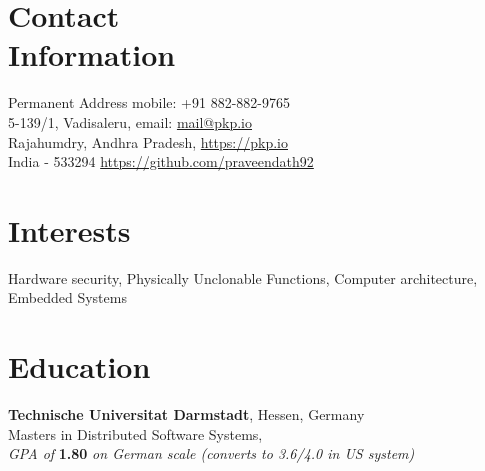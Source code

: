\documentclass[margin,line]{resume}
\begin{document}


 \vspace{55mm}
\begin{resume}

\section{\mysidestyle Contact\\Information}

    {\sc Permanent Address}				\hfill {\sc mobile}: +91 882-882-9765								\vspace{0mm}\\\vspace{0mm}%
    5-139/1, Vadisaleru,				\hfill {\sc email}: \url{mail@pkp.io}						\vspace{0mm}\\\vspace{0mm}%
    Rajahumdry, Andhra Pradesh,			\hfill {} \url{https://pkp.io}								\vspace{0mm}\\\vspace{0mm}%
    India - 533294				\hfill {}\url{https://github.com/praveendath92}
        
\section{\mysidestyle Interests}
Hardware security, Physically Unclonable Functions, Computer architecture, Embedded Systems
\vspace{-2mm}

\section{\mysidestyle Education}
		
		{\bf Technische Universitat Darmstadt}, Hessen, Germany\\
		Masters in Distributed Software Systems,\\
        \textit{\hspace*{2mm}GPA of} \textbf{1.80} \textit{on German scale (converts to 3.6/4.0 in US system)}
        \vspace{-2mm}
		

\end{resume}
\end{document}
